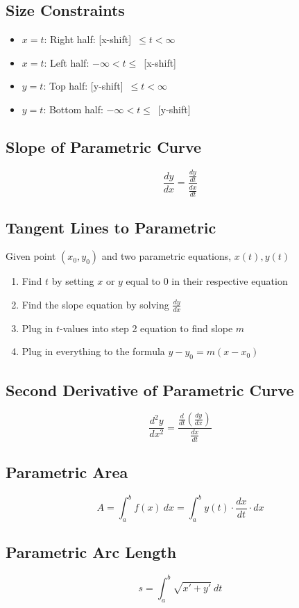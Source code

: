 \documentclass[12pt]{article}
\begin{document}
\subsection{Size Constraints}
\begin{itemize}
    \item $x=t$: Right half: [x-shift]\ $\leq t < \infty$
    \item $x=t$: Left half: $-\infty < t \leq$\ [x-shift]
    \item $y=t$: Top half: [y-shift]\ $\leq t < \infty$
    \item $y=t$: Bottom half: $-\infty < t \leq$\ [y-shift]
\end{itemize}

\subsection{Slope of Parametric Curve}
$$\frac{dy}{dx} = \frac{\frac{dy}{dt}}{\frac{dx}{dt}}$$

\subsection{Tangent Lines to Parametric}
Given point $(x_0, y_0)$ and two parametric equations, $x(t), y(t)$
\begin{enumerate}
    \item Find $t$ by setting $x$ or $y$ equal to $0$ in their respective equation
    \item Find the slope equation by solving $\frac{dy}{dx}$
    \item Plug in $t$-values into step 2 equation to find slope $m$
    \item Plug in everything to the formula $y-y_0=m(x-x_0)$
\end{enumerate}

\subsection{Second Derivative of Parametric Curve}
$$\frac{d^2y}{dx^2} = \frac{\frac{d}{dt}\left(\frac{dy}{dx}\right)}{\frac{dx}{dt}}$$

\subsection{Parametric Area}
$$A=\int_a^b f(x) \ dx = \int_a^b y(t) \cdot \frac{dx}{dt} \cdot dx$$

\subsection{Parametric Arc Length}
$$s=\int_a^b \sqrt{x' + y'}\ dt$$
\end{document}
